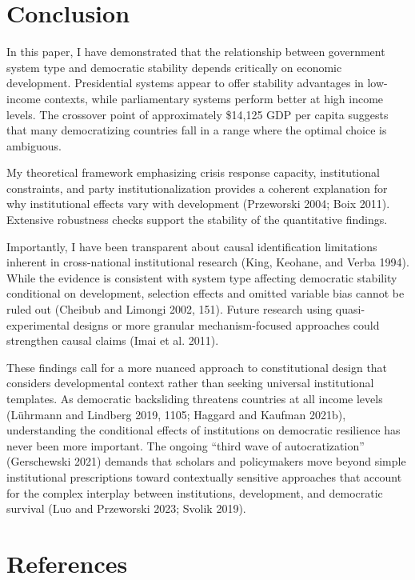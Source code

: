 \documentclass[
  letterpaper,
  DIV=11,
  numbers=noendperiod]{scrartcl}
\begin{document}
\section{Conclusion}\label{sec-conclusion}

In this paper, I have demonstrated that the relationship between
government system type and democratic stability depends critically on
economic development. Presidential systems appear to offer stability
advantages in low-income contexts, while parliamentary systems perform
better at high income levels. The crossover point of approximately
\$14,125 GDP per capita suggests that many democratizing countries fall
in a range where the optimal choice is ambiguous.

My theoretical framework emphasizing crisis response capacity,
institutional constraints, and party institutionalization provides a
coherent explanation for why institutional effects vary with development
(Przeworski 2004; Boix 2011). Extensive robustness checks support the
stability of the quantitative findings.

Importantly, I have been transparent about causal identification
limitations inherent in cross-national institutional research (King,
Keohane, and Verba 1994). While the evidence is consistent with system
type affecting democratic stability conditional on development,
selection effects and omitted variable bias cannot be ruled out (Cheibub
and Limongi 2002, 151). Future research using quasi-experimental designs
or more granular mechanism-focused approaches could strengthen causal
claims (Imai et al. 2011).

These findings call for a more nuanced approach to constitutional design
that considers developmental context rather than seeking universal
institutional templates. As democratic backsliding threatens countries
at all income levels (Lührmann and Lindberg 2019, 1105; Haggard and
Kaufman 2021b), understanding the conditional effects of institutions on
democratic resilience has never been more important. The ongoing ``third
wave of autocratization'' (Gerschewski 2021) demands that scholars and
policymakers move beyond simple institutional prescriptions toward
contextually sensitive approaches that account for the complex interplay
between institutions, development, and democratic survival (Luo and
Przeworski 2023; Svolik 2019).

\newpage

\section{References}\label{references}
\end{document}
